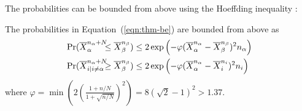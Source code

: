 The probabilities can be bounded from above using the
Hoeffding inequality \cite{Hoeffding.ineq}:
\begin{thm} The probabilities in Equation~(\ref{eqn:thm-be}) are bounded from above as
\begin{align}
  \label{eqn:probound-blnk-hoeffding}
  \Pr&(\overline X_\alpha^{{n_\alpha}+N}\hspace{-6pt} \le \overline X_\beta^{n_\beta})
  \le 2\exp\left(- \varphi (\overline X_\alpha^{n_\alpha} - \overline X_\beta^{n_\beta})^2 n_\alpha
  \right)\nonumber\\
  \Pr&(\overline X_{i|i\ne\alpha}^{n_\alpha+N}\hspace{-6pt} \ge \overline X_\beta^{n_\beta})
  \le 2\exp\left(- \varphi (\overline X_\alpha^{n_\alpha} -\overline  X_i^{n_i})^2 n_i \right)\hspace{-6pt}
\end{align}
where $\varphi=\min \left(2(\frac {1+n/N} {1+\sqrt {n/N}})^2\right)=8(\sqrt 2 - 1)^2 > 1.37$.
\label{thm:hoeffding-prob-bounds}
\end{thm}


